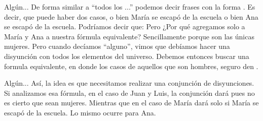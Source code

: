 


\begin{frame}{Algún...}
  De forma similar a ``todos los ...'' podemos decir frases con la forma
  .
  \jump
  Es decir, que puede haber dos casos, o bien María se escapó de la escuela o bien
  Ana se escapó de la escuela. Podríamos decir que:
  \jump
  \jump
  Pero ¿Por qué agregamos solo a María y Ana a nuestra fórmula equivalente?
  Sencillamente porque son las únicas mujeres. Pero cuando decíamos ``alguno'',
  vimos que debíamos hacer una disyunción con todos los elementos del universo.
  Debemos entonces buscar una formula equivalente, en donde los casos de aquellos
  que son hombres, seguro den \fullfalse.
\end{frame}


\begin{frame}{Algún...}
  Así, la idea es que necesitamos realizar una conjunción de disyunciones.
  \jump
  \jump
  Si analizamos esa fórmula, en el caso de Juan y Luis, la conjunción dará \fullfalse
  pues no es cierto que sean mujeres. Mientras que en el caso de María
  dará \fulltrue solo si María se escapó de la escuela. Lo mismo ocurre para Ana.
\end{frame}

